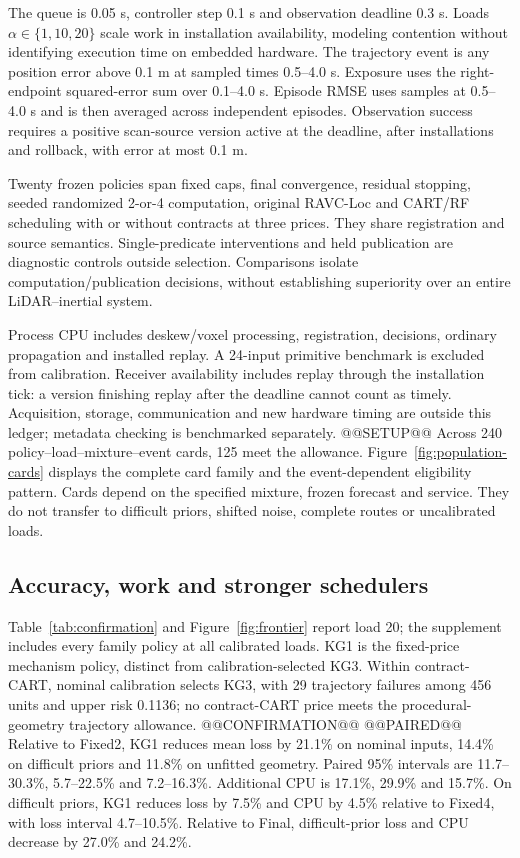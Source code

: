 The queue is 0.05 s, controller step 0.1 s and observation deadline 0.3 s. Loads $\alpha\in\{1,10,20\}$ scale work in installation availability, modeling contention without identifying execution time on embedded hardware. The trajectory event is any position error above 0.1 m at sampled times 0.5--4.0 s. Exposure uses the right-endpoint squared-error sum over 0.1--4.0 s. Episode RMSE uses samples at 0.5--4.0 s and is then averaged across independent episodes. Observation success requires a positive scan-source version active at the deadline, after installations and rollback, with error at most 0.1 m.

Twenty frozen policies span fixed caps, final convergence, residual stopping, seeded randomized 2-or-4 computation, original RAVC-Loc and CART/RF scheduling with or without contracts at three prices. They share registration and source semantics. Single-predicate interventions and held publication are diagnostic controls outside selection. Comparisons isolate computation/publication decisions, without establishing superiority over an entire LiDAR--inertial system.

Process CPU includes deskew/voxel processing, registration, decisions, ordinary propagation and installed replay. A 24-input primitive benchmark is excluded from calibration. Receiver availability includes replay through the installation tick: a version finishing replay after the deadline cannot count as timely. Acquisition, storage, communication and new hardware timing are outside this ledger; metadata checking is benchmarked separately.
@@SETUP@@
Across 240 policy--load--mixture--event cards, 125 meet the allowance. Figure~\ref{fig:population-cards} displays the complete card family and the event-dependent eligibility pattern. Cards depend on the specified mixture, frozen forecast and service. They do not transfer to difficult priors, shifted noise, complete routes or uncalibrated loads.


\subsection{Accuracy, work and stronger schedulers}
Table~\ref{tab:confirmation} and Figure~\ref{fig:frontier} report load 20; the supplement includes every family policy at all calibrated loads. KG1 is the fixed-price mechanism policy, distinct from calibration-selected KG3. Within contract-CART, nominal calibration selects KG3, with 29 trajectory failures among 456 units and upper risk 0.1136; no contract-CART price meets the procedural-geometry trajectory allowance.
@@CONFIRMATION@@
@@PAIRED@@
Relative to Fixed2, KG1 reduces mean loss by 21.1\% on nominal inputs, 14.4\% on difficult priors and 11.8\% on unfitted geometry. Paired 95\% intervals are 11.7--30.3\%, 5.7--22.5\% and 7.2--16.3\%. Additional CPU is 17.1\%, 29.9\% and 15.7\%. On difficult priors, KG1 reduces loss by 7.5\% and CPU by 4.5\% relative to Fixed4, with loss interval 4.7--10.5\%. Relative to Final, difficult-prior loss and CPU decrease by 27.0\% and 24.2\%.

